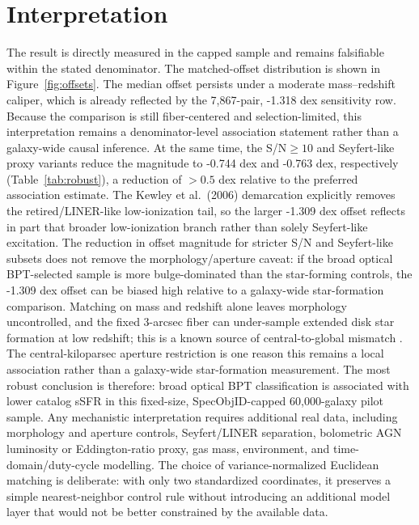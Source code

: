 \documentclass[twocolumn]{aastex631}
\begin{document}
\section{Interpretation}
The result is directly measured in the capped sample and remains falsifiable within the stated denominator. The matched-offset distribution is shown in Figure~\ref{fig:offsets}. The median offset persists under a moderate mass--redshift caliper, which is already reflected by the 7,867-pair, -1.318 dex sensitivity row. Because the comparison is still fiber-centered and selection-limited, this interpretation remains a denominator-level association statement rather than a galaxy-wide causal inference. At the same time, the S/N$\geq10$ and Seyfert-like proxy variants reduce the magnitude to -0.744 dex and -0.763 dex, respectively (Table~\ref{tab:robust}), a reduction of $>0.5$ dex relative to the preferred association estimate. The Kewley et al.\ (2006) demarcation explicitly removes the retired/LINER-like low-ionization tail, so the larger -1.309 dex offset reflects in part that broader low-ionization branch rather than solely Seyfert-like excitation. The reduction in offset magnitude for stricter S/N and Seyfert-like subsets does not remove the morphology/aperture caveat: if the broad optical BPT-selected sample is more bulge-dominated than the star-forming controls, the -1.309 dex offset can be biased high relative to a galaxy-wide star-formation comparison. Matching on mass and redshift alone leaves morphology uncontrolled, and the fixed 3-arcsec fiber can under-sample extended disk star formation at low redshift; this is a known source of central-to-global mismatch \citep[e.g.,][]{harrison2017,ellison2021}. The central-kiloparsec aperture restriction is one reason this remains a local association rather than a galaxy-wide star-formation measurement. The most robust conclusion is therefore: broad optical BPT classification is associated with lower catalog sSFR in this fixed-size, SpecObjID-capped 60,000-galaxy pilot sample. Any mechanistic interpretation requires additional real data, including morphology and aperture controls, Seyfert/LINER separation, bolometric AGN luminosity or Eddington-ratio proxy, gas mass, environment, and time-domain/duty-cycle modelling.
The choice of variance-normalized Euclidean matching is deliberate: with only two standardized coordinates, it preserves a simple nearest-neighbor control rule without introducing an additional model layer that would not be better constrained by the available data.
\end{document}
